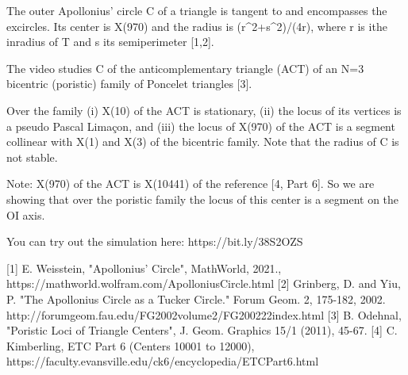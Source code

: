 The outer Apollonius' circle C of a triangle is tangent to and encompasses the excircles. Its center is X(970) and the radius is (r^2+s^2)/(4r), where r is ithe inradius of T and s its semiperimeter [1,2].

The video studies C of the anticomplementary triangle (ACT) of an N=3 bicentric (poristic) family of Poncelet triangles [3].

Over the family (i) X(10) of the ACT is stationary, (ii) the locus of its vertices is a pseudo Pascal Limaçon, and (iii) the locus of X(970) of the ACT is a segment collinear with X(1) and X(3) of the bicentric family. Note that the radius of C is not stable.

Note: X(970) of the ACT is X(10441) of the reference [4, Part 6]. So we are showing that over the poristic family the locus of this center is a segment on the OI axis.

You can try out the simulation here: https://bit.ly/38S2OZS

[1] E. Weisstein, "Apollonius' Circle", MathWorld, 2021., https://mathworld.wolfram.com/ApolloniusCircle.html
[2] Grinberg, D. and Yiu, P. "The Apollonius Circle as a Tucker Circle." Forum Geom. 2, 175-182, 2002. http://forumgeom.fau.edu/FG2002volume2/FG200222index.html
[3] B. Odehnal, "Poristic Loci of Triangle Centers", J. Geom. Graphics 15/1 (2011), 45-67.
[4] C. Kimberling, ETC Part 6 (Centers 10001 to 12000), https://faculty.evansville.edu/ck6/encyclopedia/ETCPart6.html